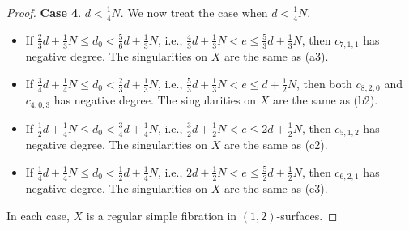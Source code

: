 \documentclass[a4paper,11pt]{amsart}
\newcommand{\s}{\ensuremath{\mathfrak{s}}}
\theoremstyle{definition}
\theoremstyle{remark}
\numberwithin{equation}{section}
\begin{document}
\begin{proof}
    \textbf{Case 4}. $d < \frac{1}{4}N$. We now treat the case when $d < \frac{1}{4}N$.

    \begin{itemize}
        \item [(a4)] If $\frac{2}{3}d+\frac{1}{3}N\leq d_0<\frac{5}{6}d+\frac{1}{3}N$, i.e., $\frac{4}{3}d + \frac{1}{3}N <e\leq \frac{5}{3}d+\frac{1}{3}N$, then $c_{7,1,1}$ has negative degree. The singularities on $X$ are the same as (a3).

        \item [(b4)] If $\frac{3}{4}d+\frac{1}{4}N\leq d_0<\frac{2}{3}d+\frac{1}{3}N$, i.e., $\frac{5}{3}d+\frac{1}{3}N<e\leq d+\frac{1}{2}N$, then both $c_{8,2,0}$ and $c_{4,0,3}$ has negative degree. The singularities on $X$ are the same as (b2).

        \item [(c4)] If $\frac{1}{2}d+\frac{1}{4}N\leq d_0<\frac{3}{4}d+\frac{1}{4}N$, i.e., $\frac{3}{2}d+\frac{1}{2}N<e\leq 2d+\frac{1}{2}N$, then $c_{5,1,2}$ has negative degree. The singularities on $X$ are the same as (c2).

        \item[(d4)] If $\frac{1}{4}d+\frac{1}{4}N\leq d_0<\frac{1}{2}d+\frac{1}{4}N$, i.e., $2d+\frac{1}{2}N<e\leq \frac{5}{2}d+\frac{1}{2}N$, then $c_{6,2,1}$ has negative degree. %
        The singularities on $X$ are the same as (e3). %
    \end{itemize}
	In each case, $X$ is a regular simple fibration in $(1, 2)$-surfaces. 
    

\end{proof}
\end{document}

